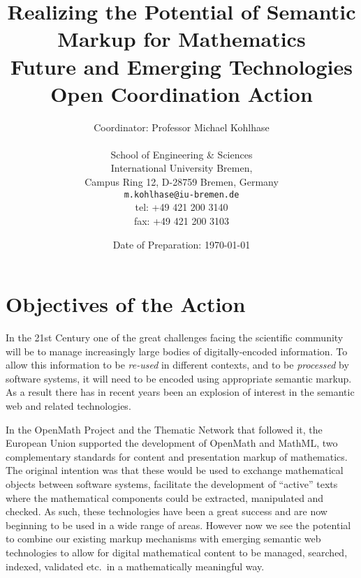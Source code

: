 \documentclass[draft]{artikel3}
\begin{document}
\title{Realizing the Potential of Semantic  Markup for Mathematics\\
  \normalfont\large Future and Emerging Technologies Open Coordination
  Action}
\date{Date of Preparation: \today} 
\author{\normalfont\large  Coordinator: Professor Michael Kohlhase\\
  \parbox[t]{.5\textwidth}{
    \normalfont\normalsize School of Engineering \& Sciences\\
    \normalfont\normalsize International University Bremen, \\
    \normalfont\normalsize Campus Ring 12, D-28759 Bremen, Germany}
\hfill
 \parbox[t]{.5\textwidth}{\raggedleft
  \normalfont\normalsize \texttt{m.kohlhase@iu-bremen.de}\\
\normalfont\normalsize tel: +49 421 200 3140\\
\normalfont\normalsize fax: +49 421 200 3103}
}


\titlepage 

\maketitle
\showednotestrue

\section{Objectives of the Action}

In the 21st Century one of the great challenges facing the scientific
community will be to manage increasingly large bodies of
digitally-encoded information.  To allow this information to be
\emph{re-used} in different contexts, and to be \emph{processed} by
software systems,
it will need to be encoded using appropriate
semantic markup.  As a result there has in recent years been an
explosion of interest in the semantic web and related technologies.

In the OpenMath Project and the Thematic Network that followed it, the
European Union supported the development of OpenMath and MathML, two
complementary standards for content and presentation markup of
mathematics.  The original intention was that these would be used to
exchange mathematical objects between software systems, facilitate the
development of ``active'' texts where the mathematical components
could be extracted, manipulated and checked.  As such, these
technologies have been a great success and are now beginning to be
used in a wide range of areas.  However now we see the potential to
combine our existing markup mechanisms with emerging semantic web
technologies to allow for digital mathematical content to be managed,
searched, indexed, validated etc.~in a mathematically meaningful way.
\end{document}
